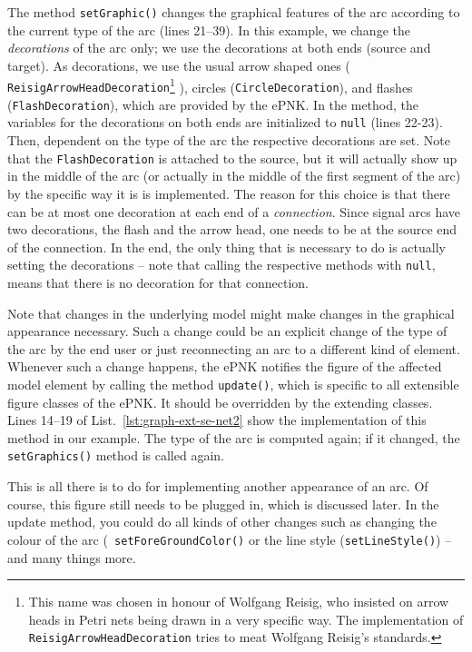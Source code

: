The method {\tt setGraphic()} changes the graphical features of the arc
according to the current type of the arc (lines 21--39). In this example,
we change the \emph{decorations}%
of the arc only; we use the decorations at both ends (source and target). As
decorations, we use the usual arrow shaped ones ({\tt
ReisigArrowHeadDecoration}\footnote {This name was chosen in honour of Wolfgang Reisig, who insisted on
   arrow heads in Petri nets being drawn in a very specific way. The
   implementation of {\tt ReisigArrowHeadDecoration} tries to meat
   Wolfgang Reisig's standards.}%
), circles ({\tt CircleDecoration}), and flashes ({\tt FlashDecoration}),
which are provided by the ePNK.%
In the method, the variables for the decorations on both ends are initialized
to {\tt null} (lines 22-23). Then, dependent on the type of the arc the
respective decorations are set. Note that the {\tt FlashDecoration} is attached to
the source, but it will actually show up in the middle of the arc (or
actually in the middle of the first segment of the arc)  by the specific way it
is is implemented. The reason for this choice is that there can be at most
one decoration at each end of a \emph{connection}.%
Since signal arcs have two decorations, the flash and the arrow head, one needs
to be at the source end of the connection. In the end, the only thing
that is necessary to do is actually setting the decorations -- note that calling
the respective methods with {\tt null}, means that there is no decoration for
that connection.

Note that changes in the underlying model might make changes in the
graphical appearance necessary. Such a change could be an explicit change of
the type of the arc by the end user or just reconnecting an arc to
a different kind of element. Whenever such a change happens, the ePNK
notifies the figure of the affected model element by calling
the method {\tt update()},%
which is specific to all extensible figure classes of the ePNK. It should be
overridden by the extending classes. Lines 14--19 of
List.~\ref{lst:graph-ext-se-net2} show the implementation of this method in our
example. The type of the arc is computed again; if it changed, the {\tt
setGraphics()} method is called again.

This is all there is to do for implementing another appearance of an
arc. Of course, this figure still needs to be plugged in, which is
discussed later. In the update method, you could do all kinds
of other changes such as changing the colour of the arc ({\tt
setForeGroundColor()}%
or the line style ({\tt setLineStyle()})%
 -- and many things more.

